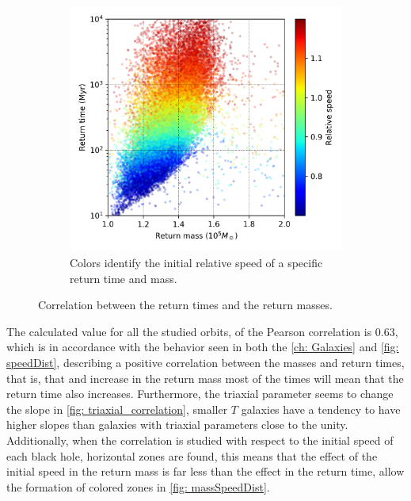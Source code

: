 \begin{figure}[h]
\begin{subfigure}[b]{0.49\textwidth}
			\includegraphics[width = \textwidth]{"../Files/Week 13/correlation_speed"}
			\caption{Colors identify the initial relative speed of a specific return time and mass.}
		\end{subfigure}
		\caption{Correlation between the return times and the return masses.}
		\label{fig: speed_correlation}
	\end{figure}
	
	The calculated value for all the studied orbits, of the Pearson correlation is 0.63, which is in accordance with the behavior seen in both the \autoref{ch: Galaxies} and \autoref{fig: speedDist}, describing a positive correlation between the masses and return times, that is, that and increase in the return mass most of the times will mean that the return time also increases. Furthermore, the triaxial parameter seems to change the slope in \autoref{fig: triaxial_correlation}, smaller $T$ galaxies have a tendency to have higher slopes than galaxies with triaxial parameters close to the unity. Additionally, when the correlation is studied with respect to the initial speed of each black hole, horizontal zones are found, this means that the effect of the initial speed in the return mass is far less than the effect in the return time, allow the formation of colored zones in \autoref{fig: massSpeedDist}. 
	
